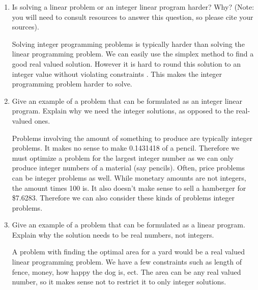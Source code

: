 \documentclass{article}
\begin{document}
\begin{enumerate}
\item Is solving a linear problem or an integer linear program harder?  Why?
(Note: you will need to consult resources to answer this question, so
please cite your sources).

Solving integer programming problems is typically harder than solving the linear programming problem. We can easily use the simplex method to find a good real valued solution. However it is hard to round this solution to an integer value without violating constraints \cite{ip}. This makes the integer programming problem harder to solve. 

\item Give an example of a problem that can be formulated as an integer
linear program.  Explain why we need the integer solutions, as opposed
to the real-valued ones.

Problems involving the amount of something to produce are typically integer problems. It makes no sense to make 0.1431418 of a pencil. Therefore we must optimize a problem for the largest integer number as we can only produce integer numbers of a material (say pencils). Often, price problems can be integer problems as well. While monetary amounts are not integers, the amount times 100 is. It also doesn't make sense to sell a hamberger for \$7.6283. Therefore we can also consider these kinds of problems integer problems.


\item Give an example of a problem that can be formulated as a linear
program.  Explain why the solution needs to be real numbers, not integers.

A problem with finding the optimal area for a yard would be a real valued linear programming problem. We have a few constraints such as length of fence, money, how happy the dog is, ect. The area can be any real valued number, so it makes sense not to restrict it to only integer solutions.

\end{enumerate}

\cite{*}


\end{document}
